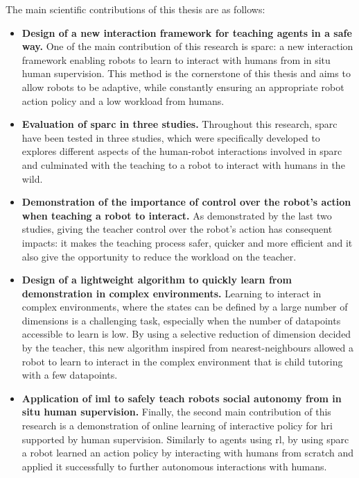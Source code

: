 The main scientific contributions of this thesis are as follows:
\begin{itemize}
	\item \textbf{Design of a new interaction framework for teaching agents in a safe way.} One of the main contribution of this research is \gls{sparc}: a new interaction framework enabling robots to learn to interact with humans from in situ human supervision. This method is the cornerstone of this thesis and aims to allow robots to be adaptive, while constantly ensuring an appropriate robot action policy and a low workload from humans.
	
	\item \textbf{Evaluation of \gls{sparc} in three studies.} Throughout this research, \gls{sparc} have been tested in three studies, which were specifically developed to explores different aspects of the human-robot interactions involved in \gls{sparc} and culminated with the teaching to a robot to interact with humans in the wild.
	
	\item \textbf{Demonstration of the importance of control over the robot's action when teaching a robot to interact.} As demonstrated by the last two studies, giving the teacher control over the robot's action has consequent impacts: it makes the teaching process safer, quicker and more efficient and it also give the opportunity to reduce the workload on the teacher.
	
	\item \textbf{Design of a lightweight algorithm to quickly learn from demonstration in complex environments.} Learning to interact in complex environments, where the states can be defined by a large number of dimensions is a challenging task, especially when the number of datapoints accessible to learn is low. By using a selective reduction of dimension decided by the teacher, this new algorithm inspired from nearest-neighbours allowed a robot to learn to interact in the complex environment that is child tutoring with a few datapoints. 
	
	\item \textbf{Application of \gls{iml} to safely teach robots social autonomy from in situ human supervision.} Finally, the second main contribution of this research is a demonstration of online learning of interactive policy for \gls{hri} supported by human supervision. Similarly to agents using \gls{rl}, by using \gls{sparc} a robot learned an action policy by interacting with humans from scratch and applied it successfully to further autonomous interactions with humans.
	
\end{itemize}

